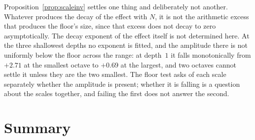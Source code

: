 \documentclass[11pt,a4paper]{article}
\theoremstyle{plain}
\theoremstyle{definition}
\theoremstyle{remark}
\begin{document}
Proposition~\ref{prop:scaleinv} settles one thing and deliberately not
another. Whatever produces the decay of the effect with $N$, it is not
the arithmetic excess that produces the floor's size, since that
excess does not decay to zero asymptotically. The decay exponent of the effect itself
is not determined here. At the three shallowest depths no exponent is
fitted, and the amplitude there is not uniformly below the floor
across the range: at depth~$1$ it falls monotonically from $+2.71$ at
the smallest octave to $+0.69$ at the largest, and two octaves cannot
settle it unless they are the two smallest. The floor test asks of each scale separately whether
the amplitude is present; whether it is falling is a question about
the scales together, and failing the first does not answer the
second.

\section{Summary}
\end{document}
